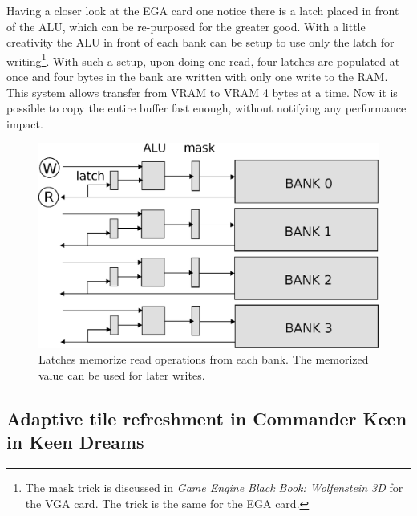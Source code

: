 \documentclass[book.tex]{subfiles}
\begin{document}
\par
Having a closer look at the EGA card one notice there is a latch placed in front of the ALU, which can be re-purposed for the greater good. With a little creativity the ALU in front of each bank can be setup to use only the latch for writing\footnote{The mask trick is discussed in \textit{Game Engine Black Book: Wolfenstein 3D} for the VGA card. The trick is the same for the EGA card.}. With such a setup, upon doing one read, four latches are populated at once and four bytes in the bank are written with only one write to the RAM. This system allows transfer from VRAM to VRAM 4 bytes at a time. Now it is possible to copy the entire buffer fast enough, without notifying any performance impact.\\

\par
 \begin{figure}[H]
\centering
 \includegraphics[width=\textwidth]{imgs/drawings/latches.eps}
 \caption{Latches memorize read operations from each bank. The memorized value can be used for later writes.}
 \end{figure}
 
 
\par
\begin{minipage}{\textwidth}
  
  \end{minipage}
  \label{ega_latch_copy}
  \par





\pagebreak

\subsection{Adaptive tile refreshment in Commander Keen in Keen Dreams} \label{section:scroll_refresh_dreams}
\end{document}

